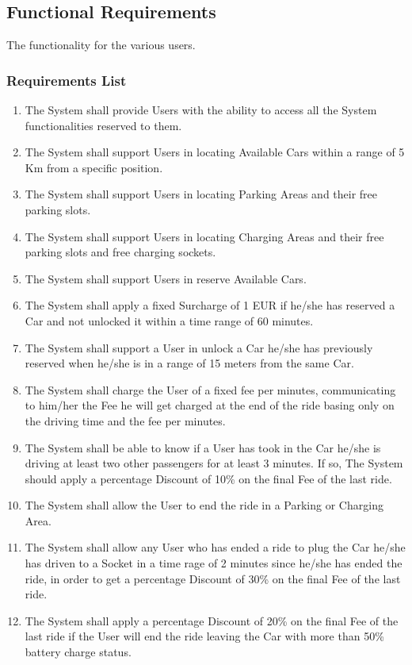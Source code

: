 \subsection{Functional Requirements}
The functionality for the various users.
\subsubsection {Requirements List}
\begin{enumerate}[label=\textbf{R\arabic*}]
	\item The System shall provide Users with the ability to access all the System functionalities reserved to them.
	\item The System shall support Users in locating Available Cars within a range of 5 Km from a specific position.
	\item The System shall support Users in locating Parking Areas and their free parking slots.
	\item The System shall support Users in locating Charging Areas and their free parking slots and free charging sockets.
	\item The System shall support Users in reserve Available Cars.
	\item The System shall apply a fixed Surcharge of 1 EUR if he/she has reserved a Car and not unlocked it within a time range of 60 minutes.
	\item The System shall support a User in unlock a Car he/she has previously reserved when he/she is in a range of 15 meters from the same Car.
	\item The System shall charge the User of a fixed fee per minutes, communicating to him/her the Fee he will get charged at the end of the ride basing only on the driving time and the fee per minutes.
	\item The System shall be able to know if a User has took in the Car he/she is driving at least two other passengers for at least 3 minutes. If so, The System should apply a percentage Discount of 10\% on the final Fee of the last ride.
	\item The System shall allow the User to end the ride in a Parking or Charging Area. 
	\item The System shall allow any User who has ended a ride to plug the Car he/she has driven to a Socket in a time rage of 2 minutes since he/she has ended the ride, in order to get a percentage Discount of 30\% on the final Fee of the last ride.
	\item The System shall apply a percentage Discount of 20\% on the final Fee of the last ride if the User will end the ride leaving the Car with more than 50\% battery charge status.

\end{enumerate}
